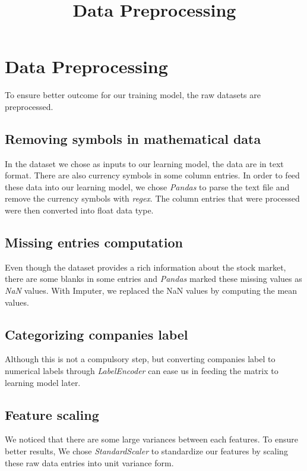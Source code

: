 \documentclass{article}
\title{Data Preprocessing}
\author{
  Shi Ji Chew, Josh McGrath, Eli Schlossberg\thanks
  CS 532 Fall 2017\\
  Department of Computer Science\\
  University of Wisconsin-Madison\\
  Madison, WI 53703 \\
  \texttt{schew2@wisc.edu} \\
}
\begin{document}

\maketitle

\section{Data Preprocessing}

To ensure better outcome for our training model, the raw datasets are preprocessed.

\subsection{Removing symbols in mathematical data}

In the dataset we chose as inputs to our learning model, the data are in text format. There are also currency symbols in some column entries. In order to feed these data into our learning model, we chose \emph{Pandas} to parse the text file and remove the currency symbols with \emph{regex}. The column entries that were processed were then converted into float data type.

\subsection{Missing entries computation}
Even though the dataset provides a rich information about the stock market, there are some blanks in some entries and \emph{Pandas} marked these missing values as \emph{NaN} values. With Imputer, we replaced the NaN values by computing the mean values.

\subsection{Categorizing companies label}
Although this is not a compulsory step, but converting companies label to numerical labels through \emph{LabelEncoder} can ease us in feeding the matrix to learning model later.

\subsection{Feature scaling}

We noticed that there are some large variances between each features. To ensure better results, We chose \emph{StandardScaler} to standardize our features by scaling these raw data entries into unit variance form.
\end{document}

